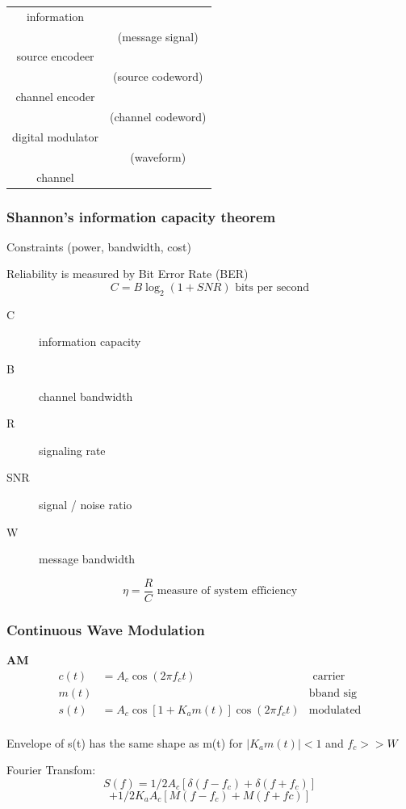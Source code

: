 \documentclass[a4paper,12pt]{article}
\begin{document}
\begin{multicols}{2}
\begin{tabular}{cc}
information&\\
&(message signal)\\
source encodeer&\\
&(source codeword)\\
channel encoder&\\
&(channel codeword)\\
digital modulator&\\
&(waveform)\\
channel&\\
\end{tabular}

\subsubsection*{Shannon's information capacity theorem}

Constraints (power, bandwidth, cost)

Reliability is measured by Bit Error Rate (BER)
\[
C = B \log_2 (1+SNR) \mbox{ \ \ bits per second}
\]
\begin{description}
\item[C] information capacity
\item[B] channel bandwidth
\item[R] signaling rate
\item[SNR] signal / noise ratio
\item[W] message bandwidth
\end{description}
\[
\eta = \frac{R}{C} \mbox{ \ \ measure of system efficiency}
\]

\subsubsection*{Continuous Wave Modulation}
\textbf{AM}
\begin{align*}
c(t) &=A_c \cos (2\pi f_ct)& \mbox{ carrier}\\
m(t) &  &\mbox{bband sig}\\
s(t) &=A_c \cos \left[1+K_am(t)\right] \cos(2\pi f_ct) &\mbox{modulated}\\
\end{align*}

Envelope of s(t) has the same shape as m(t) for $|K_a m(t)| < 1$ and $f_c >> W$

Fourier Transfom:
\[S(f) = 1/2 A_c [\delta(f-f_c)+\delta(f+f_c)]\]
\[+ 1/2K_aA_c[M(f-f_c)+M(f+fc)]\]



\end{multicols}
\end{document}
